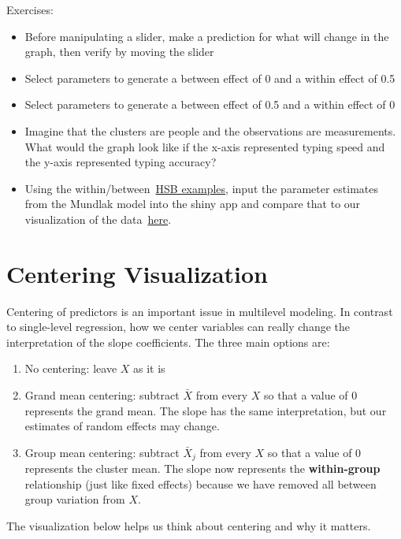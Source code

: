 \documentclass[
  letterpaper,
  DIV=11,
  numbers=noendperiod]{scrreprt}
\providecommand{\tightlist}{%
  \setlength{\itemsep}{0pt}\setlength{\parskip}{0pt}}\usepackage{longtable,booktabs,array}
\begin{document}
Exercises:

\begin{itemize}
\item
  Before manipulating a slider, make a prediction for what will change
  in the graph, then verify by moving the slider
\item
  Select parameters to generate a between effect of 0 and a within
  effect of 0.5
\item
  Select parameters to generate a between effect of 0.5 and a within
  effect of 0
\item
  Imagine that the clusters are people and the observations are
  measurements. What would the graph look like if the x-axis represented
  typing speed and the y-axis represented typing accuracy?
\item
  Using the
  within/between~\href{https://lmiratrix.github.io/MLM/within_v_between.html}{HSB
  examples}, input the parameter estimates from the Mundlak model into
  the shiny app and compare that to our visualization of the
  data~\href{https://lmiratrix.github.io/MLM/double_plot.html}{here}.
\end{itemize}

\chapter{Centering Visualization}\label{centering-visualization}

Centering of predictors is an important issue in multilevel modeling. In
contrast to single-level regression, how we center variables can really
change the interpretation of the slope coefficients. The three main
options are:

\begin{enumerate}
\def\labelenumi{\arabic{enumi}.}
\tightlist
\item
  No centering: leave \(X\) as it is
\item
  Grand mean centering: subtract \(\bar{X}\) from every \(X\) so that a
  value of 0 represents the grand mean. The slope has the same
  interpretation, but our estimates of random effects may change.
\item
  Group mean centering: subtract \(\bar{X}_j\) from every \(X\) so that
  a value of 0 represents the cluster mean. The slope now represents the
  \textbf{within-group} relationship (just like fixed effects) because
  we have removed all between group variation from \(X\).
\end{enumerate}

The visualization below helps us think about centering and why it
matters.
\end{document}
